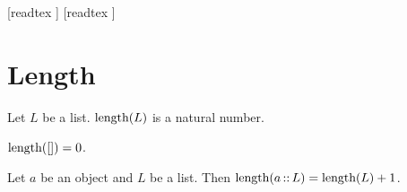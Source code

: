 \documentclass[10pt]{article}
\begin{document}
  \begin{imports}
    \begin{forthel}
      [readtex ]
      [readtex ]
    \end{forthel}
  \end{imports}


  \section*{Length}

  \begin{forthel}
    \begin{signature}[id=LISTS_LENGTH_4578620297183232,printid]
      Let $L$ be a list.
      $\textrm{length}(L)$ is a natural number.
    \end{signature}
  \end{forthel}

  \begin{forthel}
    \begin{axiom}[id=LISTS_LENGTH_3703161885818880,printid]
      $\textrm{length}([]) = 0$.
    \end{axiom}
  \end{forthel}

  \begin{forthel}
    \begin{axiom}[id=LISTS_LENGTH_8050301789536256,printid]
      Let $a$ be an object and $L$ be a list.
      Then $\textrm{length}(a \mathop{::} L) = \textrm{length}(L) + 1$.
    \end{axiom}
  \end{forthel}
\end{document}
